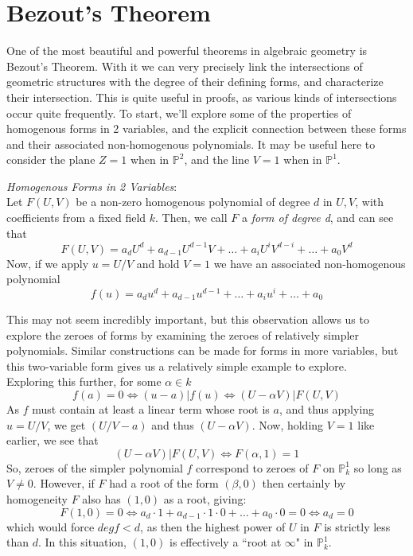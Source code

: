 \section{Bezout's Theorem}

One of the most beautiful and powerful theorems in
algebraic geometry is Bezout's Theorem. With it we
can very precisely link the intersections of 
geometric structures with the degree of their
defining forms, and characterize their intersection.
This is quite useful in proofs, as various kinds
of intersections occur quite frequently. To start,
we'll explore some of the properties of homogenous
forms in 2 variables, and the explicit connection
between these forms and their associated non-homogenous 
polynomials. It may be useful here to consider
the plane $Z=1$ when in $\mathbb{P}^2$, and the line
$V=1$ when in $\mathbb{P}^1$.

\begin{theorem}
\emph{Homogenous Forms in 2 Variables}:\\

Let $F(U,V)$ be a non-zero homogenous polynomial of degree $d$ in $U,V$,
with coefficients from a fixed field $k$. Then, we call $F$ a \emph{form of degree d},
and can see that
\[
F(U,V) = a_dU^d+a_{d-1}U^{d-1}V + \dots + a_iU^iV^{d-i}+\dots+a_0V^d
\]
Now, if we apply $u=U/V$ and hold $V=1$ we have an associated non-homogenous polynomial
\[
f(u) = a_du^d + a_{d-1}u^{d-1} + \dots + a_iu^i + \dots + a_0
\]
\end{theorem}


This may not seem incredibly important, but this observation
allows us to explore the zeroes of forms by examining the zeroes
of relatively simpler polynomials. Similar constructions can be made
for forms in more variables, but this two-variable form gives us a relatively
simple example to explore.\\

Exploring this further, for some $\alpha \in k$
\[ %
f(a) = 0 \iff (u-a)|f(u) \iff (U-\alpha V) | F(U,V)
\]
As $f$ must contain at least a linear term whose root is $a$, and
thus applying $u=U/V$, we get $(U/V - a)$ and thus $(U - \alpha V)$. Now, 
holding $V=1$ like earlier, we see that
\[
(U-\alpha V) | F(U,V) \iff F(\alpha,1) = 1
\]
So, zeroes of the simpler polynomial $f$ correspond to zeroes of $F$
on $\mathbb{P}^1_k$ so long as $V \ne 0$. However, if $F$ had a root
of the form $(\beta,0)$ then certainly by homogeneity $F$ also has
$(1,0)$ as a root, giving:
\[
F(1,0) = 0 \iff a_d \cdot 1 + a_{d-1} \cdot 1 \cdot 0 + \dots + a_0 \cdot 0 = 0 \iff a_d = 0
\]
which would force $deg f < d$, as then the highest power of $U$ in $F$ is strictly
less than $d$. In this situation, $(1,0)$ is effectively a ``root at $\infty$" in $\mathbb{P}^1_k$.

